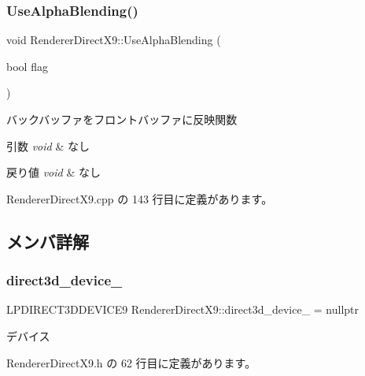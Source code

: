 \subsubsection{\texorpdfstring{Use\+Alpha\+Blending()}{UseAlphaBlending()}}
{\footnotesize\ttfamily void Renderer\+Direct\+X9\+::\+Use\+Alpha\+Blending (\begin{DoxyParamCaption}\item[{bool}]{flag }\end{DoxyParamCaption})}



バックバッファをフロントバッファに反映関数 


\begin{DoxyParams}{引数}
{\em void} & なし \\
\hline
\end{DoxyParams}

\begin{DoxyRetVals}{戻り値}
{\em void} & なし \\
\hline
\end{DoxyRetVals}


 Renderer\+Direct\+X9.\+cpp の 143 行目に定義があります。



\subsection{メンバ詳解}
\mbox{\label{class_renderer_direct_x9_aba9ae366d583e965418423ec76454a61}} 
\subsubsection{\texorpdfstring{direct3d\+\_\+device\+\_\+}{direct3d\_device\_}}
{\footnotesize\ttfamily L\+P\+D\+I\+R\+E\+C\+T3\+D\+D\+E\+V\+I\+C\+E9 Renderer\+Direct\+X9\+::direct3d\+\_\+device\+\_\+ = nullptr\hspace{0.3cm}{\ttfamily [private]}}



デバイス 



 Renderer\+Direct\+X9.\+h の 62 行目に定義があります。

\mbox{\label{class_renderer_direct_x9_a1616ee343f701fe647ed8d1727c8229d}} 
